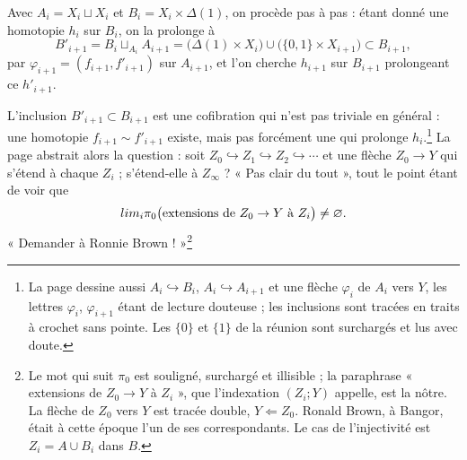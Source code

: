 \documentclass[11pt,a4paper]{article}
\begin{document}
Avec $A_{i} = X_{i} \sqcup X_{i}$ et $B_{i} = X_{i} \times \Delta(1)$, on
procède pas à pas : étant donné une homotopie $h_{i}$ sur $B_{i}$, on la
prolonge à
\[
B'_{i+1} = B_{i} \sqcup_{A_{i}} A_{i+1} = \bigl(\Delta(1) \times X_{i}\bigr)
\cup \bigl(\{0, 1\} \times X_{i+1}\bigr) \subset B_{i+1},
\]
par $\varphi_{i+1} = (f_{i+1}, f'_{i+1})$ sur $A_{i+1}$, et l'on cherche
$h_{i+1}$ sur $B_{i+1}$ prolongeant ce $h'_{i+1}$.


L'inclusion $B'_{i+1} \subset B_{i+1}$ est une cofibration qui n'est pas
triviale en général : une homotopie $f_{i+1} \sim f'_{i+1}$ existe, mais pas
forcément une qui prolonge $h_{i}$.\footnote{La page dessine aussi $A_{i}
\hookrightarrow B_{i}$, $A_{i} \hookrightarrow A_{i+1}$ et une flèche
$\varphi_{i}$ de $A_{i}$ vers $Y$, les lettres $\varphi_{i}$, $\varphi_{i+1}$
étant de lecture douteuse ; les inclusions sont tracées en traits à crochet
sans pointe. Les $\{0\}$ et $\{1\}$ de la réunion sont surchargés et lus avec
doute.} La page abstrait alors la question : soit $Z_{0} \hookrightarrow Z_{1}
\hookrightarrow Z_{2} \hookrightarrow \cdots$ et une flèche $Z_{0} \to Y$ qui
s'étend à chaque $Z_{i}$ ; s'étend-elle à $Z_{\infty}$ ? « Pas clair du tout »,
tout le point étant de voir que
\[
\varprojlim_{i} \pi_{0}\bigl(\text{extensions de } Z_{0} \to Y \text{ à }
Z_{i}\bigr) \neq \varnothing .
\]
« Demander à Ronnie Brown ! »\footnote{Le mot qui suit $\pi_{0}$ est souligné,
surchargé et illisible ; la paraphrase « extensions de $Z_{0} \to Y$ à
$Z_{i}$ », que l'indexation $(Z_{i} ; Y)$ appelle, est la nôtre. La flèche
de $Z_{0}$ vers $Y$ est tracée double, $Y \Leftarrow Z_{0}$. Ronald Brown, à
Bangor, était à cette époque l'un de ses correspondants. Le cas de
l'injectivité est $Z_{i} = A \cup B_{i}$ dans $B$.}
\end{document}
